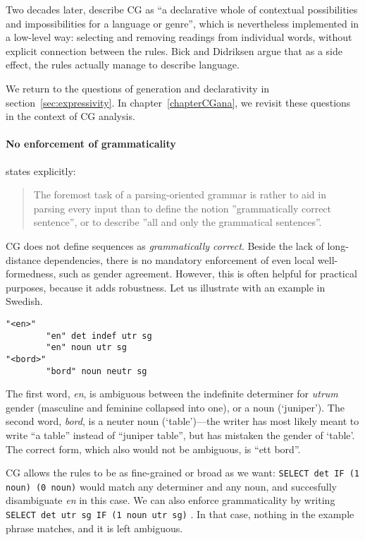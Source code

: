 Two decades later, \cite{bick2015} describe CG as ``a
declarative whole of contextual possibilities and impossibilities for
a language or genre'', which is nevertheless implemented in a
low-level way: selecting and removing readings from individual words,
without explicit connection between the rules. Bick and Didriksen
argue that as a side effect, the rules actually manage to describe language.

We return to the questions of generation and declarativity in section~\ref{sec:expressivity}. 
In chapter~\ref{chapterCGana}, we revisit these questions in the context of CG analysis.

 
\paragraph{No enforcement of grammaticality} 

\cite{karlsson1995constraint} states explicitly:

\begin{quote}
The foremost task of a parsing-oriented grammar is rather to aid in parsing every input than to define the notion ”grammatically correct sentence”, or to describe ”all and only the grammatical sentences”.
\end{quote}


CG does not define sequences as \emph{grammatically correct}.
Beside the lack of long-distance dependencies, there is
no mandatory enforcement of even local well-formedness, such as gender agreement.
However, this is often helpful for practical purposes, because it adds robustness.
Let us illustrate with an example in Swedish.

\begin{verbatim}
"<en>"
        "en" det indef utr sg
        "en" noun utr sg 
"<bord>"
        "bord" noun neutr sg
\end{verbatim}

The first word, \emph{en}, is ambiguous between the indefinite determiner for
\emph{utrum} gender  (masculine and feminine collapsed into one), or a noun (`juniper').
The second word, \emph{bord}, is a neuter noun (`table')---the writer has
most likely meant to write ``a table'' instead of ``juniper table'', but has mistaken the gender of `table'. The correct form, which also would not be ambiguous, is ``ett bord''.

CG allows the rules to be as fine-grained or broad as we want: 
\texttt{SELECT det IF (1 noun) (0 noun)} would match any determiner and any noun, 
and succesfully disambiguate \emph{en} in this case. 
We can also enforce grammaticality by writing \texttt{SELECT det utr sg IF (1 noun utr sg)}%
. In that case, nothing in the example phrase matches, and it is left ambiguous.



